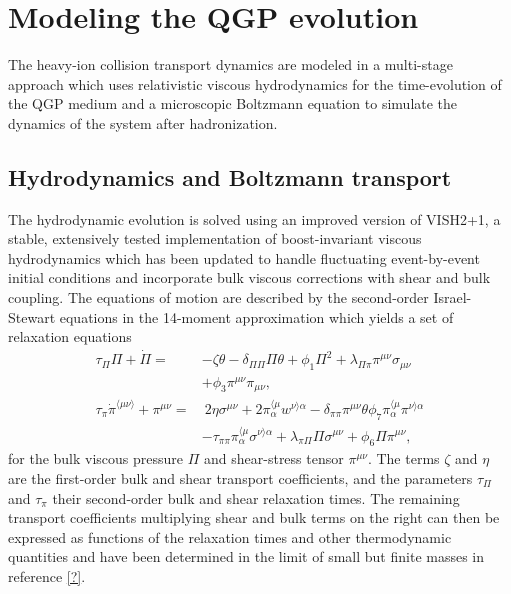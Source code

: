 \documentclass[aps,prc,reprint,amsmath,nofootinbib]{revtex4-1}
\begin{document}
\section{Modeling the QGP evolution}


The heavy-ion collision transport dynamics are modeled in a multi-stage approach which uses relativistic viscous hydrodynamics for the time-evolution of the QGP medium and a microscopic Boltzmann equation to simulate the dynamics of the system after hadronization. 

\subsection{Hydrodynamics and Boltzmann transport}

The hydrodynamic evolution is solved using an improved version of VISH2+1, a stable, extensively tested implementation of boost-invariant viscous hydrodynamics which has been updated to handle fluctuating event-by-event initial conditions and incorporate bulk viscous corrections with shear and bulk coupling.
The equations of motion are described by the second-order Israel-Stewart equations in the 14-moment approximation which yields a set of relaxation equations
\begin{subequations}
    \label{relaxation}
    \begin{align}
        \tau_\Pi \Pi + \dot{\Pi} =& -\zeta \theta - \delta_{\Pi\Pi} \Pi\theta + \phi_1 \Pi^2 + \lambda_{\Pi\pi} \pi^{\mu\nu} \sigma_{\mu\nu} \nonumber \\ 
        &+\phi_3 \pi^{\mu\nu}\pi_{\mu\nu}, \\
        \tau_\pi \dot{\pi}^{\langle \mu\nu \rangle} + \pi^{\mu\nu} =& ~2\eta\sigma^{\mu\nu} + 2\pi_\alpha^{\langle \mu} w^{\nu \rangle \alpha} - \delta_{\pi\pi} \pi^{\mu\nu} \theta \phi_7    \pi_\alpha^{\langle \mu} \pi^{\nu \rangle \alpha} \nonumber \\
&-\tau_{\pi\pi} \pi_\alpha^{\langle \mu}\sigma^{\nu \rangle \alpha} + \lambda_{\pi\Pi} \Pi \sigma^{\mu\nu} + \phi_6 \Pi \pi^{\mu\nu},
    \end{align}
\end{subequations}
for the bulk viscous pressure $\Pi$ and shear-stress tensor $\pi^{\mu\nu}$.
The terms $\zeta$ and $\eta$ are the first-order bulk and shear transport coefficients, and the parameters $\tau_\Pi$ and $\tau_\pi$ their second-order bulk and shear relaxation times.
The remaining transport coefficients multiplying shear and bulk terms on the right can then be expressed as functions of the relaxation times and other thermodynamic quantities and have been determined in the limit of small but finite masses in reference \ref{?}.
\end{document}
